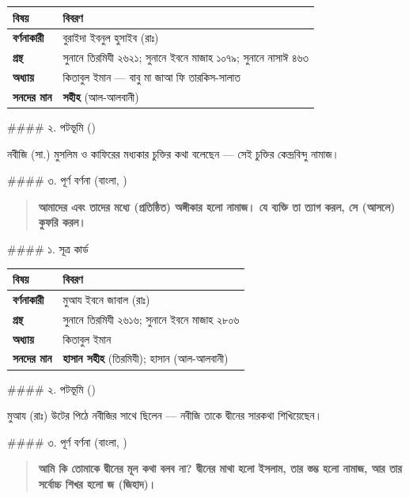 \begin{table}[h]\centering\small
\begin{tabular}{ll}
বিষয় & বিবরণ \\
\hline
\textbf{বর্ণনাকারী} & বুরাইদা ইবনুল হুসাইব (রাঃ) \\
\textbf{গ্রন্থ} & সুনানে তিরমিযী ২৬২১; সুনানে ইবনে মাজাহ ১০৭৯; সুনানে নাসাঈ ৪৬৩ \\
\textbf{অধ্যায়} & কিতাবুল ইমান — বাবু মা জাআ ফি তারকিস-সালাত \\
\textbf{সনদের মান} & \textbf{সহীহ} (আল-আলবানী) \\
\hline
\end{tabular}
\end{table}

\#\#\#\# ২. পটভূমি ()

নবীজি (সা.) মুসলিম ও কাফিরের মধ্যকার চুক্তির কথা বলেছেন — সেই চুক্তির কেন্দ্রবিন্দু নামাজ।

\#\#\#\# ৩. পূর্ণ বর্ণনা (বাংলা, )

\begin{quote}
\textbf{আমাদের এবং তাদের মধ্যে (প্রতিষ্ঠিত) অঙ্গীকার হলো নামাজ। যে ব্যক্তি তা ত্যাগ করল, সে (আসলে) কুফরি করল।}
\end{quote}

\#\#\#\# ১. সূত্র কার্ড

\begin{table}[h]\centering\small
\begin{tabular}{ll}
বিষয় & বিবরণ \\
\hline
\textbf{বর্ণনাকারী} & মুআয ইবনে জাবাল (রাঃ) \\
\textbf{গ্রন্থ} & সুনানে তিরমিযী ২৬১৬; সুনানে ইবনে মাজাহ ২৮০৬ \\
\textbf{অধ্যায়} & কিতাবুল ইমান \\
\textbf{সনদের মান} & \textbf{হাসান সহীহ} (তিরমিযী); হাসান (আল-আলবানী) \\
\hline
\end{tabular}
\end{table}

\#\#\#\# ২. পটভূমি ()

মুআয (রাঃ) উটের পিঠে নবীজির সাথে ছিলেন — নবীজি তাকে দ্বীনের সারকথা শিখিয়েছেন।

\#\#\#\# ৩. পূর্ণ বর্ণনা (বাংলা, )

\begin{quote}
\textbf{আমি কি তোমাকে দ্বীনের মূল কথা বলব না? দ্বীনের মাথা হলো ইসলাম, তার স্তম্ভ হলো নামাজ, আর তার সর্বোচ্চ শিখর হলো জ (জিহাদ)।}
\end{quote}


